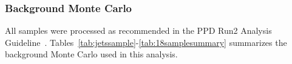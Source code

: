 %
%
%

\subsubsection{Background Monte Carlo}
All samples were processed as recommended in the PPD Run2 Analysis Guideline~\cite{pdmv}.
Tables~\ref{tab:jetssample}-\ref{tab:18samplesummary} summarizes the background Monte Carlo used in this analysis.

